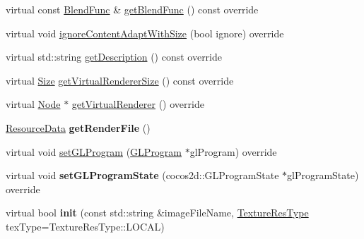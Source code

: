 \begin{DoxyCompactItemize}
\item 
virtual const \hyperlink{structBlendFunc}{Blend\+Func} \& \hyperlink{classui_1_1ImageView_a0216c8cc372c22f705d7da03ef842ad8}{get\+Blend\+Func} () const override
\item 
virtual void \hyperlink{classui_1_1ImageView_ac9fea31a3800b0960189d168d90ccb19}{ignore\+Content\+Adapt\+With\+Size} (bool ignore) override
\item 
virtual std\+::string \hyperlink{classui_1_1ImageView_a1153b5455bf7efddac3fe5beb8c46b57}{get\+Description} () const override
\item 
virtual \hyperlink{classSize}{Size} \hyperlink{classui_1_1ImageView_ace03b24b332e54c73f4d36c83afddd3c}{get\+Virtual\+Renderer\+Size} () const override
\item 
virtual \hyperlink{classNode}{Node} $\ast$ \hyperlink{classui_1_1ImageView_af98c832737c94dd9113967df15854318}{get\+Virtual\+Renderer} () override
\item 
\mbox{\label{classui_1_1ImageView_aa9250b87c85a7cde510526041e23d854}} 
\hyperlink{structResourceData}{Resource\+Data} {\bfseries get\+Render\+File} ()
\item 
virtual void \hyperlink{classui_1_1ImageView_adf4dee6b3cee1d981f2a671dcef2ce7a}{set\+G\+L\+Program} (\hyperlink{classGLProgram}{G\+L\+Program} $\ast$gl\+Program) override
\item 
\mbox{\label{classui_1_1ImageView_ad770d53c6827099511346784e9de9afa}} 
virtual void {\bfseries set\+G\+L\+Program\+State} (cocos2d\+::\+G\+L\+Program\+State $\ast$gl\+Program\+State) override
\item 
\mbox{\label{classui_1_1ImageView_aaa959ef33c0d4dd93afb55bf29d93d22}} 
virtual bool {\bfseries init} (const std\+::string \&image\+File\+Name, \hyperlink{classui_1_1Widget_a040a65ec5ad3b11119b7e16b98bd9af0}{Texture\+Res\+Type} tex\+Type=Texture\+Res\+Type\+::\+L\+O\+C\+AL)
\end{DoxyCompactItemize}
